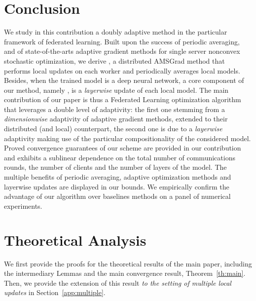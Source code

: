 \documentclass{article}
\begin{document}
\section{Conclusion}\label{sec:conclusion}

We study in this contribution a doubly adaptive method in the particular framework of federated learning.
Built upon the success of periodic averaging, and of state-of-the-arts adaptive gradient methods for single server nonconvex stochastic optimization, we derive \algo, a distributed AMSGrad method that performs local updates on each worker and periodically averages local models. 
Besides, when the trained model is a deep neural network, a core component of our method, namely \algo, is a \emph{layerwise} update of each local model.
The main contribution of our paper is thus a Federated Learning optimization algorithm that leverages a double level of adaptivity: the first one stemming from a \emph{dimensionwise} adaptivity of adaptive gradient methods, extended to their distributed (and local) counterpart, the second one is due to a  \emph{layerwise} adaptivity making use of the particular compositionality of the considered model.
Proved convergence guarantees of our scheme are provided in our contribution and exhibits a sublinear dependence on the total number of communications rounds, the number of clients and the number of layers of the model.
The multiple benefits of periodic averaging, adaptive optimization methods and layerwise updates are displayed in our bounds.
We empirically confirm the advantage of our algorithm over baselines methods on a panel of numerical experiments.









\clearpage


\appendix 
\onecolumn

  \hsize\textwidth
  \linewidth\hsize {}
 \bottomtitlebar 

\section{Theoretical Analysis}
We first provide the proofs for the theoretical results of the main paper, including the intermediary Lemmas and the main convergence result, Theorem~\ref{th:main}.
Then, we provide the extension of this result \emph{to the setting of multiple local updates} in Section~\ref{app:multiple}.
\end{document}
